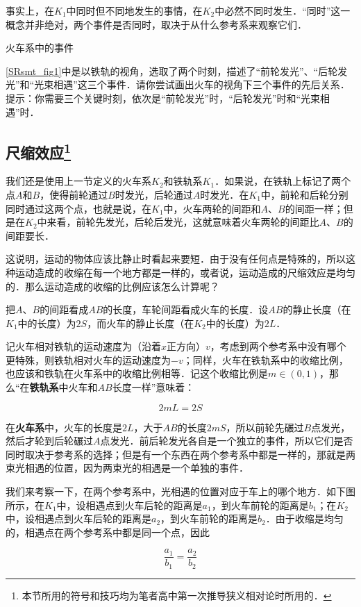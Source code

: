 事实上，在$K_1$中同时但不同地发生的事情，在$K_2$中必然不同时发生．“同时”这一概念并非绝对，两个事件是否同时，取决于从什么参考系来观察它们．

\begin{exercise}{火车系中的事件}

\autoref{SRsmt_fig1}中是以铁轨的视角，选取了两个时刻，描述了“前轮发光”、“后轮发光”和“光束相遇”这三个事件．请你尝试画出火车的视角下三个事件的先后关系．提示：你需要三个关键时刻，依次是“前轮发光”时，“后轮发光”时和“光束相遇”时．

\end{exercise}

\subsection{尺缩效应\footnote{本节所用的符号和技巧均为笔者高中第一次推导狭义相对论时所用的．}}

我们还是使用上一节定义的火车系$K_2$和铁轨系$K_1$．如果说，在铁轨上标记了两个点$A$和$B$，使得前轮通过$B$时发光，后轮通过$A$时发光．在$K_1$中，前轮和后轮分别同时通过这两个点，也就是说，在$K_1$中，火车两轮的间距和$A$、$B$的间距一样；但是在$K_2$中来看，前轮先发光，后轮后发光，这就意味着火车两轮的间距比$A$、$B$的间距要长．

这说明，运动的物体应该比静止时看起来要短．由于没有任何点是特殊的，所以这种运动造成的收缩在每一个地方都是一样的，或者说，运动造成的尺缩效应是均匀的．那么运动造成的收缩的比例应该怎么计算呢？

把$A$、$B$的间距看成$AB$的长度，车轮间距看成火车的长度．设$AB$的静止长度（在$K_1$中的长度）为$2S$，而火车的静止长度（在$K_2$中的长度）为$2L$．

记火车相对铁轨的运动速度为（沿着$x$正方向）$v$，考虑到两个参考系中没有哪个更特殊，则铁轨相对火车的运动速度为$-v$；同样，火车在铁轨系中的收缩比例，也应该和铁轨在火车系中的收缩比例相等．记这个收缩比例是$m\in(0,1)$，那么“在\textbf{铁轨系}中火车和$AB$长度一样”意味着：

\begin{equation}
2mL=2S
\end{equation}

在\textbf{火车系}中，火车的长度是$2L$，大于$AB$的长度$2mS$，所以前轮先碾过$B$点发光，然后才轮到后轮碾过$A$点发光．前后轮发光各自是一个独立的事件，所以它们是否同时取决于参考系的选择；但是有一个东西在两个参考系中都是一样的，那就是两束光相遇的位置，因为两束光的相遇是一个单独的事件．

我们来考察一下，在两个参考系中，光相遇的位置对应于车上的哪个地方．如下图所示，在$K_1$中，设相遇点到火车后轮的距离是$a_1$，到火车前轮的距离是$b_1$；在$K_2$中，设相遇点到火车后轮的距离是$a_2$，到火车前轮的距离是$b_2$．由于收缩是均匀的，相遇点在两个参考系中都是同一个点，因此

\begin{equation}
\frac{a_1}{b_1}=\frac{a_2}{b_2}
\end{equation}






